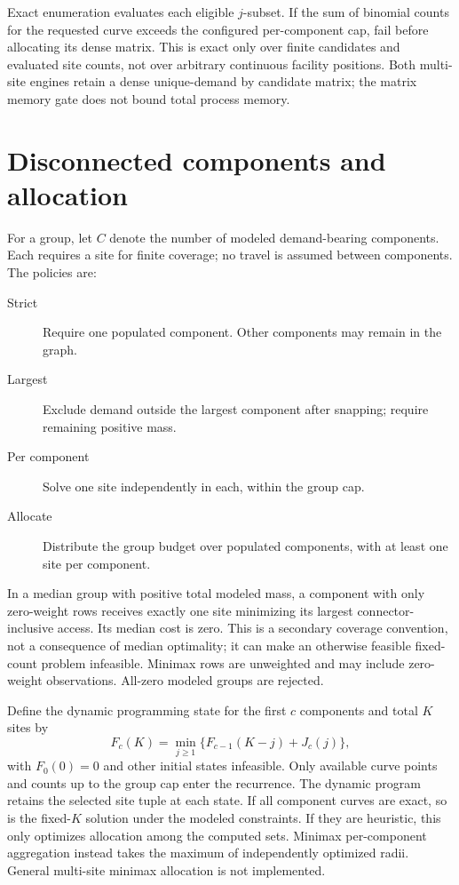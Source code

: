 \documentclass[11pt,a4paper]{article}
\begin{document}
Exact enumeration evaluates each eligible $j$-subset. If the sum of binomial counts for the requested curve exceeds the configured per-component cap, fail before allocating its dense matrix. This is exact only over finite candidates and evaluated site counts, not over arbitrary continuous facility positions. Both multi-site engines retain a dense unique-demand by candidate matrix; the matrix memory gate does not bound total process memory.
\section{Disconnected components and allocation}
For a group, let $C$ denote the number of modeled demand-bearing components. Each requires a site for finite coverage; no travel is assumed between components. The policies are:
\begin{description}
\item[Strict] Require one populated component. Other components may remain in the graph.
\item[Largest] Exclude demand outside the largest component after snapping; require remaining positive mass.
\item[Per component] Solve one site independently in each, within the group cap.
\item[Allocate] Distribute the group budget over populated components, with at least one site per component.
\end{description}
In a median group with positive total modeled mass, a component with only zero-weight rows receives exactly one site minimizing its largest connector-inclusive access. Its median cost is zero. This is a secondary coverage convention, not a consequence of median optimality; it can make an otherwise feasible fixed-count problem infeasible. Minimax rows are unweighted and may include zero-weight observations. All-zero modeled groups are rejected.

Define the dynamic programming state for the first $c$ components and total $K$ sites by
\[
 F_c(K)=\min_{j\ge1}\bigl\{F_{c-1}(K-j)+J_c(j)\bigr\},
\]
with $F_0(0)=0$ and other initial states infeasible. Only available curve points and counts up to the group cap enter the recurrence. The dynamic program retains the selected site tuple at each state. If all component curves are exact, so is the fixed-$K$ solution under the modeled constraints. If they are heuristic, this only optimizes allocation among the computed sets. Minimax per-component aggregation instead takes the maximum of independently optimized radii. General multi-site minimax allocation is not implemented.
\end{document}
